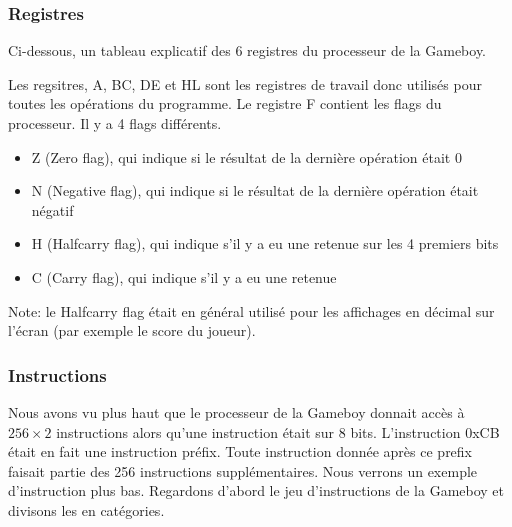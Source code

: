 \documentclass[a4paper]{article}
\begin{document}
\subsubsection{Registres}
Ci-dessous, un tableau explicatif des 6 registres du processeur de la Gameboy.
\begin{center}
\end{center}
Les regsitres, A, BC, DE et HL sont les registres de travail donc utilisés pour
toutes les opérations du programme. Le registre F contient les flags du processeur.
Il y a 4 flags différents.
\begin{itemize}[label=\textbullet]
	\item Z (Zero flag), qui indique si le résultat de la dernière opération était 0
	\item N (Negative flag), qui indique si le résultat de la dernière opération était négatif
	\item H (Halfcarry flag), qui indique s'il y a eu une retenue sur les 4 premiers bits
	\item C (Carry flag), qui indique s'il y a eu une retenue
\end{itemize}
Note: le Halfcarry flag était en général utilisé pour les affichages en décimal sur
l'écran (par exemple le score du joueur).

\subsubsection{Instructions}
Nous avons vu plus haut que le processeur de la Gameboy donnait accès à $256 \times 2$
instructions alors qu'une instruction était sur 8 bits. L'instruction 0xCB était
en fait une instruction préfix. Toute instruction donnée après ce prefix faisait
partie des 256 instructions supplémentaires. Nous verrons un exemple d'instruction
plus bas. Regardons d'abord le jeu d'instructions de la Gameboy et divisons les en catégories.
\end{document}
